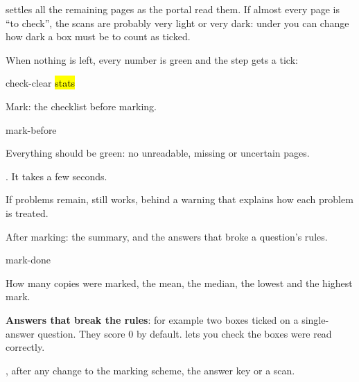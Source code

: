 \documentclass[11pt]{article}
\begin{document}
\begin{tip}
 settles all the remaining pages as the portal read them. If almost every page is ``to check'', the scans are probably very light or very dark: under  you can change how dark a box must be to count as ticked.
\end{tip}

When nothing is left, every number is green and the step gets a tick:

\begin{center}
\begin{shot}[0.8\linewidth]{check-clear}
  \hl{stats}
\end{shot}
\end{center}

\label{step:mark}

\begin{keep}
\begin{guidefig}{Mark: the checklist before marking.}
\begin{shot}[0.72\linewidth]{mark-before}
\end{shot}
\end{guidefig}
\begin{callouts}
  \item Everything should be green: no unreadable, missing or uncertain pages.
  \item {}. It takes a few seconds.
\end{callouts}
\end{keep}

\begin{tip}
If problems remain,  still works, behind a warning that explains how each problem is treated.
\end{tip}

\begin{keep}
\begin{guidefig}{After marking: the summary, and the answers that broke a question's rules.}
\begin{shot}{mark-done}
\end{shot}
\end{guidefig}
\begin{callouts}
  \item How many copies were marked, the mean, the median, the lowest and the highest mark.
  \item \textbf{Answers that break the rules}: for example two boxes ticked on a single-answer question. They score 0 by default.  lets you check the boxes were read correctly.
  \item {}, after any change to the marking scheme, the answer key or a scan.
\end{callouts}
\end{keep}
\end{document}
